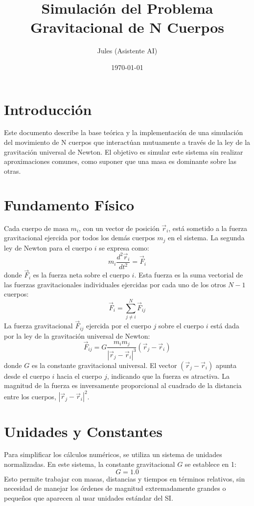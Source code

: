 \documentclass{article}
\title{Simulación del Problema Gravitacional de N Cuerpos}
\author{Jules (Asistente AI)}
\date{\today}
\begin{document}
\maketitle

\section{Introducción}
Este documento describe la base teórica y la implementación de una simulación del movimiento de N cuerpos que interactúan mutuamente a través de la ley de la gravitación universal de Newton. El objetivo es simular este sistema sin realizar aproximaciones comunes, como suponer que una masa es dominante sobre las otras.

\section{Fundamento Físico}
Cada cuerpo de masa $m_i$, con un vector de posición $\vec{r}_i$, está sometido a la fuerza gravitacional ejercida por todos los demás cuerpos $m_j$ en el sistema. La segunda ley de Newton para el cuerpo $i$ se expresa como:
\begin{equation}
m_i \frac{d^2\vec{r}_i}{dt^2} = \vec{F}_i
\end{equation}
donde $\vec{F}_i$ es la fuerza neta sobre el cuerpo $i$. Esta fuerza es la suma vectorial de las fuerzas gravitacionales individuales ejercidas por cada uno de los otros $N-1$ cuerpos:
\begin{equation}
\vec{F}_i = \sum_{j \neq i}^{N} \vec{F}_{ij}
\end{equation}
La fuerza gravitacional $\vec{F}_{ij}$ ejercida por el cuerpo $j$ sobre el cuerpo $i$ está dada por la ley de la gravitación universal de Newton:
\begin{equation}
\vec{F}_{ij} = G \frac{m_i m_j}{|\vec{r}_j - \vec{r}_i|^3} (\vec{r}_j - \vec{r}_i)
\label{eq:fuerza_grav}
\end{equation}
donde $G$ es la constante gravitacional universal. El vector $(\vec{r}_j - \vec{r}_i)$ apunta desde el cuerpo $i$ hacia el cuerpo $j$, indicando que la fuerza es atractiva. La magnitud de la fuerza es inversamente proporcional al cuadrado de la distancia entre los cuerpos, $|\vec{r}_j - \vec{r}_i|^2$.

\section{Unidades y Constantes}
Para simplificar los cálculos numéricos, se utiliza un sistema de unidades normalizadas. En este sistema, la constante gravitacional $G$ se establece en 1:
\begin{equation}
G = 1.0
\end{equation}
Esto permite trabajar con masas, distancias y tiempos en términos relativos, sin necesidad de manejar los órdenes de magnitud extremadamente grandes o pequeños que aparecen al usar unidades estándar del SI.
\end{document}
